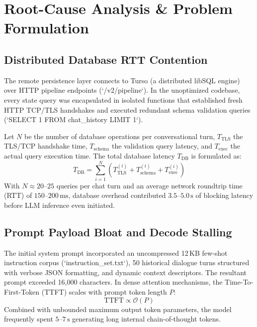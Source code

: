\documentclass[conference]{IEEEtran}
\begin{document}
\section{Root-Cause Analysis \& Problem Formulation}

\subsection{Distributed Database RTT Contention}
The remote persistence layer connects to Turso (a distributed libSQL engine) over HTTP pipeline endpoints (`/v2/pipeline`). In the unoptimized codebase, every state query was encapsulated in isolated functions that established fresh HTTP TCP/TLS handshakes and executed redundant schema validation queries (`SELECT 1 FROM chat_history LIMIT 1`).

Let $N$ be the number of database operations per conversational turn, $T_{\text{TLS}}$ the TLS/TCP handshake time, $T_{\text{schema}}$ the validation query latency, and $T_{\text{exec}}$ the actual query execution time. The total database latency $T_{\text{DB}}$ is formulated as:
\begin{equation}
T_{\text{DB}} = \sum_{i=1}^{N} \left( T_{\text{TLS}}^{(i)} + T_{\text{schema}}^{(i)} + T_{\text{exec}}^{(i)} \right)
\end{equation}
With $N \approx 20\text{--}25$ queries per chat turn and an average network roundtrip time (RTT) of $150\text{--}200\,\text{ms}$, database overhead contributed $3.5\text{--}5.0\,\text{s}$ of blocking latency before LLM inference even initiated.

\subsection{Prompt Payload Bloat and Decode Stalling}
The initial system prompt incorporated an uncompressed 12\,KB few-shot instruction corpus (`instruction_set.txt`), 50 historical dialogue turns structured with verbose JSON formatting, and dynamic context descriptors. The resultant prompt exceeded 16,000 characters. In dense attention mechanisms, the Time-To-First-Token (TTFT) scales with prompt token length $P$:
\begin{equation}
\text{TTFT} \propto \mathcal{O}(P)
\end{equation}
Combined with unbounded maximum output token parameters, the model frequently spent $5\text{--}7\,\text{s}$ generating long internal chain-of-thought tokens.
\end{document}
